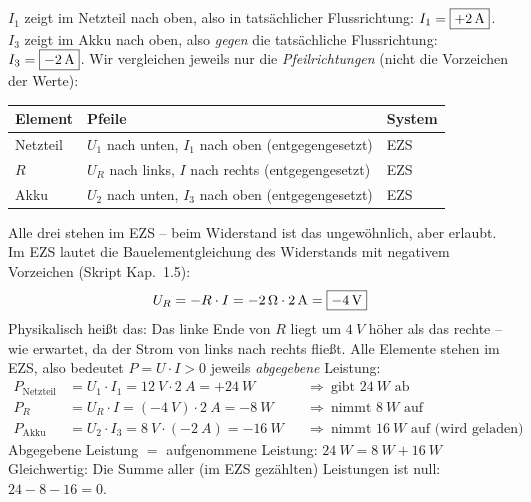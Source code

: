 \documentclass[11pt,a4paper]{article}
\begin{document}
\begin{loesung}
$I_1$ zeigt im Netzteil nach oben, also in tatsächlicher Flussrichtung: $I_1 = \boxed{+\SI{2}{A}}$.\\
$I_3$ zeigt im Akku nach oben, also \emph{gegen} die tatsächliche Flussrichtung: $I_3 = \boxed{-\SI{2}{A}}$.
Wir vergleichen jeweils nur die \emph{Pfeilrichtungen} (nicht die Vorzeichen der Werte):
\begin{center}
\begin{tabular}{lll}
\toprule
Element & Pfeile & System\\\midrule
Netzteil & $U_1$ nach unten, $I_1$ nach oben (entgegengesetzt) & EZS\\
$R$ & $U_R$ nach links, $I$ nach rechts (entgegengesetzt) & EZS\\
Akku & $U_2$ nach unten, $I_3$ nach oben (entgegengesetzt) & EZS\\\bottomrule
\end{tabular}
\end{center}
Alle drei stehen im EZS -- beim Widerstand ist das ungewöhnlich, aber erlaubt.
Im EZS lautet die Bauelementgleichung des Widerstands mit negativem Vorzeichen (Skript Kap.~1.5):
\[
  U_R = -R\cdot I = -\SI{2}{\ohm}\cdot\SI{2}{A} = \boxed{-\SI{4}{V}}
\]
Physikalisch heißt das: Das linke Ende von $R$ liegt um $\SI{4}{V}$ höher als das rechte -- wie erwartet, da der Strom von links nach rechts fließt.
Alle Elemente stehen im EZS, also bedeutet $P = U\cdot I > 0$ jeweils \emph{abgegebene} Leistung:
\begin{align*}
  P_\text{Netzteil} &= U_1\cdot I_1 = \SI{12}{V}\cdot\SI{2}{A} = +\SI{24}{W} &&\Rightarrow\ \text{gibt } \SI{24}{W} \text{ ab}\\
  P_R &= U_R\cdot I = (-\SI{4}{V})\cdot\SI{2}{A} = -\SI{8}{W} &&\Rightarrow\ \text{nimmt } \SI{8}{W} \text{ auf}\\
  P_\text{Akku} &= U_2\cdot I_3 = \SI{8}{V}\cdot(-\SI{2}{A}) = -\SI{16}{W} &&\Rightarrow\ \text{nimmt } \SI{16}{W} \text{ auf (wird geladen)}
\end{align*}
Abgegebene Leistung $=$ aufgenommene Leistung: $\SI{24}{W} = \SI{8}{W} + \SI{16}{W}$ \checkmark\\
Gleichwertig: Die Summe aller (im EZS gezählten) Leistungen ist null: $24 - 8 - 16 = 0$.
\end{loesung}
\end{document}
